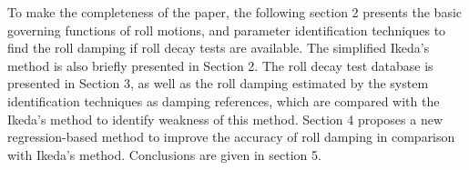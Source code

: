 To make the completeness of the paper, the following section 2 presents the basic governing functions of roll motions, and parameter identification techniques to find the roll damping if roll decay tests are available. The simplified Ikeda's method is also briefly presented in Section 2. The roll decay test database is presented in Section 3, as well as the roll damping estimated by the system identification techniques as damping references, which are compared with the Ikeda's method to identify weakness of this method. Section 4 proposes a new regression-based method to improve the accuracy of roll damping in comparison with Ikeda's method. Conclusions are given in section 5.  

